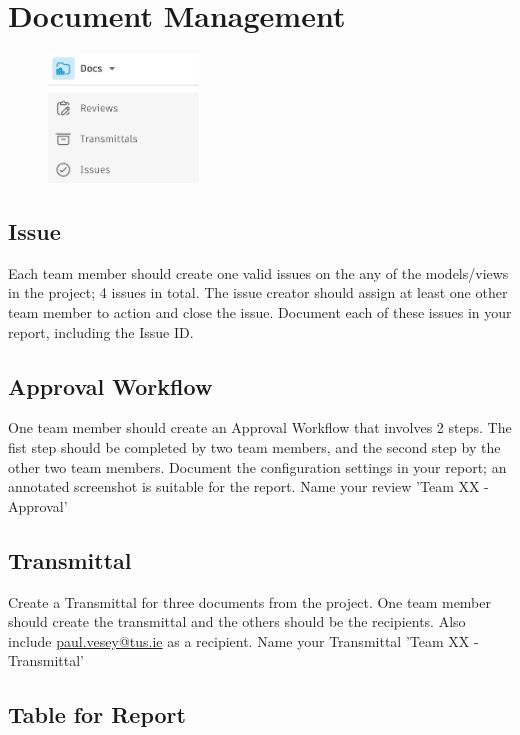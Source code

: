 \newpage

\section{Document Management}

\begin{figure}[h!t]
	\includegraphics[width=4.0cm]{RevitAssets/docs}
	\label{fig:docmgmt}
\end{figure}


\subsection{Issue}

Each team member should create one valid issues on the any of the models/views in the project; 4 issues in total.  The issue creator should assign at least one other team member to action and close the issue.  Document each of these issues in your report, including the Issue ID.

\subsection{Approval Workflow}

One team member should create an Approval Workflow that involves 2 steps.  The fist step should be completed by two team members, and the second step by the other two team members.  Document the configuration settings in your report; an annotated screenshot is suitable for the report.  Name your review 'Team XX - Approval'  

\subsection{Transmittal}

Create a Transmittal for three documents from the project.  One team member should create the transmittal and the others should be the recipients.  Also include \href{mailto:paul.vesey@tus.ie}{paul.vesey@tus.ie} as a recipient.  Name your Transmittal 'Team XX - Transmittal'

\subsection{Table for Report}

